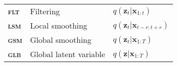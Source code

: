 {\begin{table}
\begin{tabular}{ l l l }
        \textbf{\textsc{flt}} & Filtering                             & $q(\mathbf{z}_t|\mathbf{x}_{1:t})$ \\
        \textbf{\textsc{lsm}} & Local smoothing                       & $q(\mathbf{z}_t|\mathbf{x}_{t-r:t+r})$ \\
        \textbf{\textsc{gsm}} & Global smoothing                      & $q(\mathbf{z}_t|\mathbf{x}_{1:T})$ \\
        \textbf{\textsc{glb}} & Global latent variable                & $q(\mathbf{z}|\mathbf{x}_{1:T})$ \\
        \bottomrule
    \end{tabular}
\end{table}

\begin{table*}
    \caption[Classification of selected latent variable models.]{ Selected latent variable models classified according the attributes defined throughout \cref{sec:plvms}. See \cref{tab:lvm-model-primitives} for the probability distributions that correspond to each of the attribute short-hands. \textbf{\textsc{hie}} indicates a hierarchical representation.}
    \label{tab:lvm-taxonomy}
    \centering
    \setlength{\tabcolsep}{3pt}
    \renewcommand{\arraystretch}{1.1}
\end{table*}}
